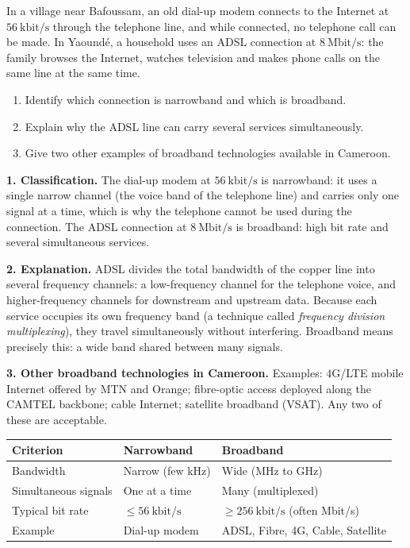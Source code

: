 \documentclass[11pt]{article}
\newcommand{\cle}[1]{{\popxbold\color{popdark}#1}}
\begin{document}
\begin{exoresolu}
In a village near Bafoussam, an old dial-up modem connects to the Internet at $56\ \mathrm{kbit/s}$ through the telephone line, and while connected, no telephone call can be made. In Yaound\'e, a household uses an ADSL connection at $8\ \mathrm{Mbit/s}$: the family browses the Internet, watches television and makes phone calls on the same line at the same time.
\begin{enumerate}
\item Identify which connection is narrowband and which is broadband.
\item Explain why the ADSL line can carry several services simultaneously.
\item Give two other examples of broadband technologies available in Cameroon.
\end{enumerate}
\tcblower
\textbf{1. Classification.} The dial-up modem at $56\ \mathrm{kbit/s}$ is \cle{narrowband}: it uses a single narrow channel (the voice band of the telephone line) and carries only one signal at a time, which is why the telephone cannot be used during the connection. The ADSL connection at $8\ \mathrm{Mbit/s}$ is \cle{broadband}: high bit rate and several simultaneous services.

\textbf{2. Explanation.} ADSL divides the total bandwidth of the copper line into several frequency channels: a low-frequency channel for the telephone voice, and higher-frequency channels for downstream and upstream data. Because each service occupies its own frequency band (a technique called \emph{frequency division multiplexing}), they travel simultaneously without interfering. Broadband means precisely this: a wide band shared between many signals.

\textbf{3. Other broadband technologies in Cameroon.} Examples: 4G/LTE mobile Internet offered by MTN and Orange; fibre-optic access deployed along the CAMTEL backbone; cable Internet; satellite broadband (VSAT). Any two of these are acceptable.
\end{exoresolu}

\begin{center}
\begin{tabularx}{\linewidth}{|l|X|X|}
\hline
\rowcolor{popblueL} \textbf{Criterion} & \textbf{Narrowband} & \textbf{Broadband} \\
\hline
Bandwidth & Narrow (few kHz) & Wide (MHz to GHz) \\
\hline
Simultaneous signals & One at a time & Many (multiplexed) \\
\hline
Typical bit rate & $\le 56\ \mathrm{kbit/s}$ & $\ge 256\ \mathrm{kbit/s}$ (often Mbit/s) \\
\hline
Example & Dial-up modem & ADSL, Fibre, 4G, Cable, Satellite \\
\hline
\end{tabularx}
\end{center}
\end{document}
